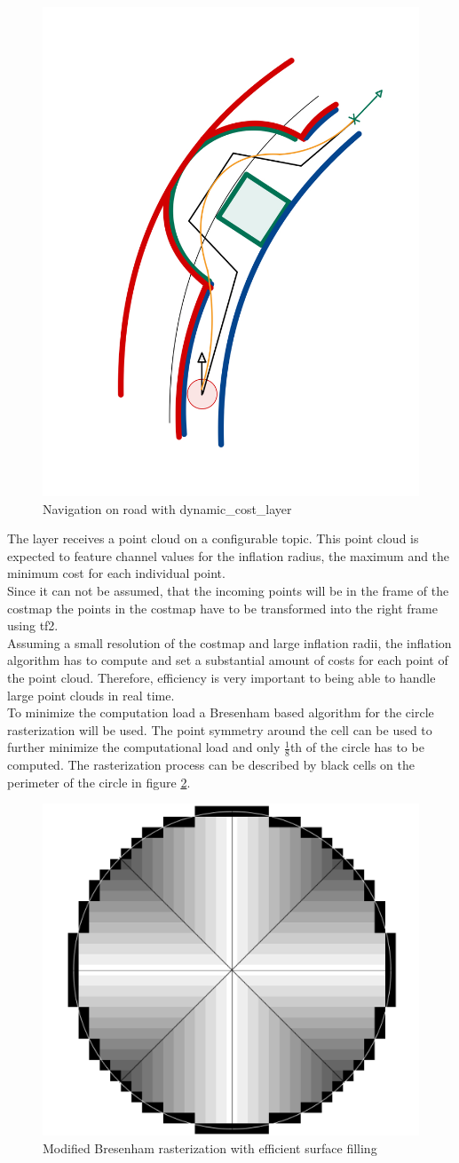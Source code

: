 \begin{figure}
	\centering
	\includegraphics[width=.5\textwidth]{Pictures/inflationlayernav}
	\caption{Navigation on road with dynamic\_cost\_layer}
	\label{dynnav}
\end{figure}


The layer receives a point cloud on a configurable topic. This point cloud is expected to feature channel values for the inflation radius, the maximum and the minimum cost for each individual point.\\

Since it can not be assumed, that the incoming points will be in the frame of the costmap the points in the costmap have to be transformed into the right frame using tf2.\\

Assuming a small resolution of the costmap and large inflation radii, the inflation algorithm has to compute and set a substantial amount of costs for each point of the point cloud. Therefore, efficiency is very important to being able to handle large point clouds in real time.\\

To minimize the computation load a Bresenham based algorithm for the circle rasterization will be used\cite{ComputerGraphics}. The point symmetry around the cell can be used to further minimize the computational load and only $\frac{1}{8}$th of the circle has to be computed. The rasterization process can be described by black cells on the perimeter of the circle in figure \ref{rasterization}.\\

\begin{figure}
	\centering
	\includegraphics[width=.5\textwidth]{Pictures/rasterization}
	\caption{Modified Bresenham rasterization with efficient surface filling}
	\label{rasterization}
\end{figure}


